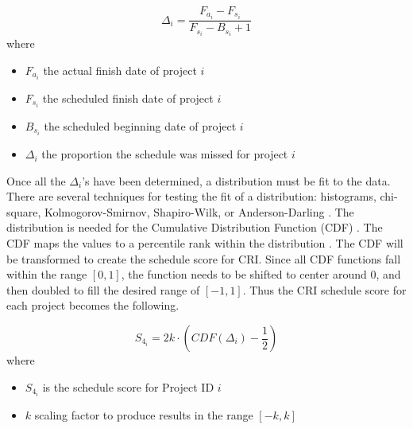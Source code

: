 \documentclass[SDSUThesis.tex]{subfiles}
\begin{document}
                \begin{displaymath}
                    \Delta_i = \frac{F_{a_i} - F_{s_i}}{ F_{s_i} - B_{s_i} + 1}
                \end{displaymath}
                where
                \begin{itemize}
                    \item $F_{a_i}$ the actual finish date of project $i$
                    \item $F_{s_i}$ the scheduled finish date of project $i$
                    \item $B_{s_i}$ the scheduled beginning date of project $i$
                    \item $\Delta_i$ the proportion the schedule was missed for project $i$
                \end{itemize}
                
                Once all the $\Delta_i$'s have been determined, a distribution must
                be fit to the data. There are several techniques for testing the fit
                of a distribution: histograms, chi-square, Kolmogorov-Smirnov, Shapiro-Wilk,
                or Anderson-Darling \cite{Damodaran2015,Kutner2003}.
                The distribution is needed for the Cumulative
                Distribution Function (CDF) 
                . 
                The CDF maps the values
                to a percentile rank within the distribution \cite{Downey2011}.
                The CDF will be transformed to create
                the schedule score for CRI. Since all CDF functions fall within the
                range $[0,1]$, the function needs to be shifted to center around 0, and then
                doubled to fill the desired range of $[-1,1]$. Thus the CRI schedule score
                for each project becomes the following.
                
                \begin{equation}
                \label{eq:CDF}
                    S_{4_i} = 2k \cdot (CDF(\Delta_i) - \frac{1}{2})
                \end{equation}
                where
                \begin{itemize}
                    \item $S_{4_i}$ is the schedule score for Project ID $i$
                    \item $k$ scaling factor to produce results in the range $[-k,k]$
                \end{itemize}
                
\end{document}
